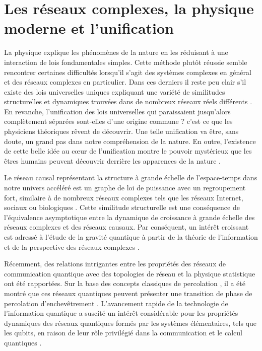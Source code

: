 \section{Les réseaux complexes, la physique moderne et l'unification}
La physique explique les phénomènes de la nature en les réduisant à une interaction de lois fondamentales simples. Cette méthode plutôt réussie semble rencontrer certaines difficultés lorsqu'il s'agit des systèmes complexes en général et des réseaux complexes en particulier. Dans ces derniers il reste peu clair s'il existe des lois universelles uniques expliquant une variété de similitudes structurelles et dynamiques trouvées dans de nombreux réseaux réels différents  \cite{K-al2012,BS2009,La-al2009,Li-al2011}. En revanche, l'\textsf{unification} des lois universelles qui paraissaient jusqu'alors complètement séparées sont-elles d'une  origine commune ? c'est ce que les physiciens théoriques rêvent de découvrir. Une telle  \textsf{unification}
va \^{e}tre, sans doute, un grand pas dans notre compréhension de la nature. En outre, l'existence de cette belle idée au cœur de l'unification montre le pouvoir mystérieux que les êtres humains peuvent découvrir derrière les apparences de la nature \cite{Sm1997}.

Le réseau causal représentant la structure à grande échelle de l'espace-temps dans notre univers accéléré est un graphe de loi de puissance avec un regroupement fort, similaire à de nombreux réseaux complexes tels que les réseaux Internet, sociaux ou biologiques \cite{K-al2012}. Cette similitude structurelle est une conséquence de l'équivalence asymptotique entre la dynamique
de croissance à grande échelle des réseaux complexes et des réseaux causaux. Par conséquent, un intérêt croissant est adressé à l'étude de la gravité quantique à partir de la théorie de l'information et de la perspective des réseaux complexes \cite{Tr2015,Bi-al2015}.

Récemment, des relations intrigantes entre les propriétés des réseaux de communication quantique avec des topologies de réseau et la physique statistique ont été rapportées. Sur la base des concepts classiques de percolation \cite{BR2006}, il a été montré que ces réseaux quantiques peuvent présenter une transition de phase de percolation d'enchevêtrement \cite{Ac-al2007,Sa1999}.
L'avancement rapide de la technologie de l'information quantique a suscité un intérêt considérable pour les propriétés dynamiques des réseaux quantiques formés par les systèmes élémentaires, tels que les qubits, en raison de leur rôle privilégié dans la communication et le calcul quantiques \cite{J-al2015,BG2007,MC2000}.\\

